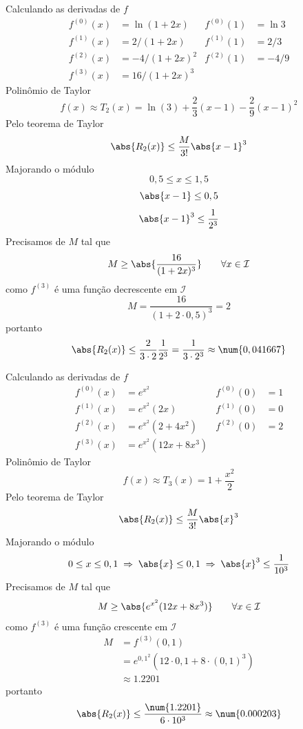\begin{exercises}
\begin{exercise}
\begin{answer}
\begin{alphalist}

			\item Calculando as derivadas de $f$
			\begin{align*}
				f^{(0)}(x) & = \ln(1+2x)   & f^{(0)}(1) & = \ln 3 \\
				f^{(1)}(x) & =  2/(1+2x)   & f^{(1)}(1) & = 2/3   \\
				f^{(2)}(x) & = -4/(1+2x)^2 & f^{(2)}(1) & = -4/9  \\
				f^{(3)}(x) & = 16/(1+2x)^3 &
			\end{align*}
			Polinômio de Taylor
			\[ f(x) \approx T_2(x) = \ln(3) + \frac{2}{3}(x-1) -\frac{2}{9}(x-1)^2 \]
			Pelo teorema de Taylor
			\[ \abs{R_2(x)} \leq \frac{M}{3!}\abs{x-1}^3 \]
			Majorando o módulo
			\[ 0,5 \leq x \leq 1,5 \]
			\[ \abs{x-1}   \leq 0,5 \]
			\[ \abs{x-1}^3 \leq \frac{1}{2^3} \]
			Precisamos de $M$ tal que
			\[ M \geq \abs{\frac{16}{(1+2x)^3}} \qquad \forall x\in \mathcal{I} \]
			como $f^{(3)}$ é uma função decrescente em $\mathcal{I}$
			\[ M = \frac{16}{(1+2\cdot 0,5)^3} = 2 \]
			portanto
			\[
			\abs{R_2(x)}
			\leq \frac{2}{3\cdot 2}\frac{1}{2^3}
			= \frac{1}{3\cdot 2^3}
			\approx \num{0,041667}
			\]

			\item Calculando as derivadas de $f$
			\begin{align*}
				f^{(0)}(x) & = e^{x^2}           & f^{(0)}(0) & = 1 \\
				f^{(1)}(x) & = e^{x^2}(2x)       & f^{(1)}(0) & = 0 \\
				f^{(2)}(x) & = e^{x^2}(2+4x^2)   & f^{(2)}(0) & = 2 \\
				f^{(3)}(x) & = e^{x^2}(12x+8x^3) &
			\end{align*}
			Polinômio de Taylor
			\[ f(x) \approx T_3(x) = 1 + \frac{x^2}{2} \]
			Pelo teorema de Taylor
			\[ \abs{R_2(x)} \leq \frac{M}{3!}\abs{x}^3 \]
			Majorando o módulo
			\[ 0 \leq x \leq 0,1
			\;\Rightarrow\; \abs{x}   \leq 0,1
			\;\Rightarrow\; \abs{x}^3 \leq \frac{1}{10^3}
			\]
			Precisamos de $M$ tal que
			\[ M \geq \abs{e^{x^2}(12x+8x^3)} \qquad \forall x\in \mathcal{I} \]
			como $f^{(3)}$ é uma função crescente em $\mathcal{I}$
			\begin{align*}
				M & = f^{(3)}(0,1)                              \\
				& = e^{0,1^2}( 12\cdot 0,1 +8\cdot (0,1)^3) \\
				& \approx \num{1.2201}
			\end{align*}
			portanto
			\[ \abs{R_2(x)} \leq  \frac{\num{1.2201}}{6\cdot 10^3} \approx \num{0.000203} \]


\end{alphalist}
\end{answer}
\end{exercise}
\end{exercises}
